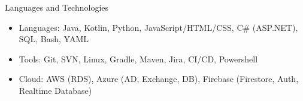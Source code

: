 \documentclass[]{mcdowellcv}
\begin{document}
	\begin{cvsection}{Languages and Technologies}
		\begin{cvsubsection}{}{}{}	
			\begin{itemize}
				\item Languages: Java, Kotlin, Python, JavaScript/HTML/CSS, C\# (ASP.NET), SQL, Bash, YAML
				\item Tools: Git, SVN, Linux, Gradle, Maven, Jira, CI/CD, Powershell
				\item Cloud: AWS (RDS), Azure (AD, Exchange, DB), Firebase (Firestore, Auth, Realtime Database)
			\end{itemize}
		\end{cvsubsection}
	\end{cvsection}
	
\end{document}
